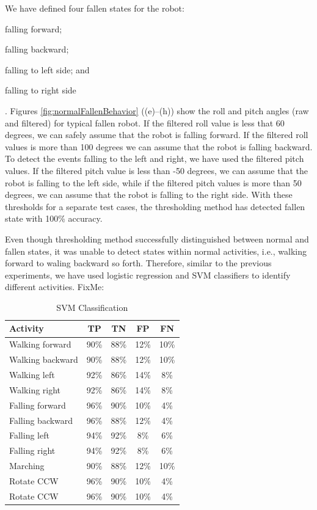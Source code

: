 \documentclass[letterpaper]{article}
\begin{document}
We have defined four fallen states for the robot: \begin{inparaenum}[(1)] \item falling
forward; \item falling backward; \item falling to left side; and \item falling to right
side\end{inparaenum}. Figures \ref{fig:normalFallenBehavior} ((e)--(h)) show the roll and pitch 
angles (raw and filtered) for typical fallen robot. If the filtered roll value is less that 60 
degrees, we can safely assume that the robot is falling forward. If the filtered roll values is 
more than 100 degrees we can assume that the robot is falling backward. To detect the events 
falling to the left and right, we have used the filtered pitch values. If the filtered pitch value 
is less than -50 degrees, we can assume that the robot is falling to the left side, while if the 
filtered pitch values is more than 50 degrees, we can assume that the robot is falling to the right 
side. With these thresholds for a separate test cases, the thresholding method has detected fallen 
state with 100\% accuracy. 


Even though thresholding method successfully distinguished between normal and fallen states, it was 
unable to detect states within normal activities, i.e., walking forward to waling backward so 
forth. Therefore, similar to the previous experiments, we have used logistic regression and SVM 
classifiers to identify different activities. FixMe:


\begin{table}[!ht]
\caption{SVM Classification}
	\label{tab:robot-svm-class}
	\centering
		\begin{tabular} {| l | c | c | c | c | }
		\hline
			{\bf Activity} & {\bf  TP}  &	{\bf TN}  &	{\bf FP} &	{\bf FN} \\ 
\hline
			Walking forward	& 90\%	& 88\%	& 12\%	& 10\% \\ \hline
			Walking backward	& 90\%	& 88\%	& 12\%	& 10\% \\ \hline
			Walking left	& 92\%	& 86\%	& 14\%	& 8\% \\ \hline
			Walking right	& 92\%	& 86\%	& 14\%	& 8\% \\ \hline
			Falling forward	& 96\%	& 90\%	& 10\%	& 4\%	 \\ \hline
			Falling backward	& 96\%	& 88\%	& 12\%	& 4\%	 \\ \hline
			Falling left	& 94\%	& 92\%	& 8\%	& 6\%	 \\ \hline
			Falling right	& 94\%	& 92\%	& 8\%	& 6\%	 \\ \hline
			Marching	& 90\%	& 88\%	& 12\%	& 10\%	 \\ \hline
			Rotate CCW	& 96\%	& 90\%	& 10\%	& 4\%	 \\ \hline
			Rotate CCW	& 96\%	& 90\%	& 10\%	& 4\%	 \\ \hline
		\end{tabular}
\end{table}
\end{document}
